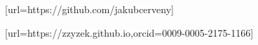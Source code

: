 \author{Jakub \v{C}erven\'{y}}[url=https://github.com/jakubcerveny]
\author{Zzyv Zzyzek}[url=https://zzyzek.github.io,orcid=0009-0005-2175-1166]

